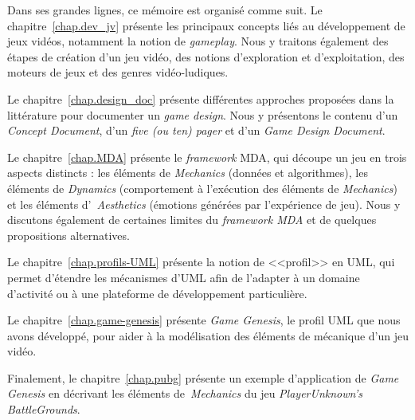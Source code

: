 \begin{introduction}
\begin{comment}
\end{comment}



Dans ses grandes lignes, ce m\'emoire est organis\'e comme suit.
Le chapitre~\ref{chap.dev_jv} pr\'esente les principaux concepts
li\'es au d\'eveloppement de jeux vid\'eos, notamment la notion de \emph{gameplay}.
Nous y traitons également des étapes de création d'un jeu vidéo, des notions d'exploration et d'exploitation, des moteurs de jeux et des genres vidéo-ludiques. 


Le chapitre~\ref{chap.design_doc} pr\'esente diff\'erentes approches
propos\'ees dans la litt\'erature pour documenter un \emph{game design}.
Nous y présentons le contenu d'un \emph{Concept Document}, d'un \emph{five (ou ten) pager} et d'un \emph{Game Design Document}.

Le chapitre~\ref{chap.MDA} pr\'esente le \emph{framework} MDA, qui découpe un jeu en trois aspects distincts : les éléments de \emph{Mechanics} (données et algorithmes), les éléments de \emph{Dynamics} (comportement à l'exécution des éléments de \emph{Mechanics}) et les éléments d'~\emph{Aesthetics} (émotions générées par l'expérience de jeu). Nous y discutons également de certaines limites du \emph{framework MDA} et de quelques propositions alternatives.

Le chapitre~\ref{chap.profils-UML} pr\'esente la notion de <<profil>>
en UML, qui permet d'étendre les mécanismes d'UML afin de l'adapter à un domaine d'activité ou à une plateforme de développement particulière.

Le chapitre~\ref{chap.game-genesis} pr\'esente \emph{Game Genesis}, le
profil UML que nous avons d\'evelopp\'e, pour aider \`a la
mod\'elisation des \'el\'ements de m\'ecanique d'un jeu vid\'eo.

Finalement, le chapitre~\ref{chap.pubg} pr\'esente un exemple d'application de \emph{Game Genesis} en décrivant les éléments de~\emph{Mechanics} du jeu \emph{PlayerUnknown's BattleGrounds}.




\end{introduction}

